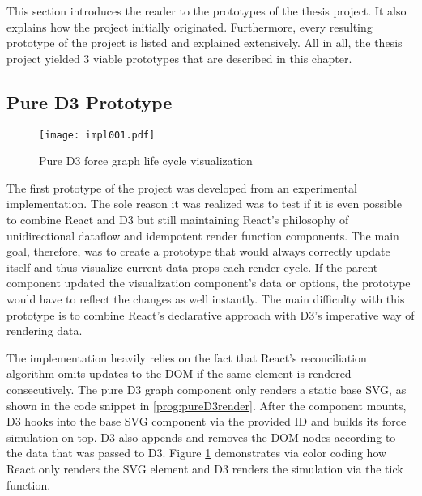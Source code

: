 This section introduces the reader to the prototypes of the thesis project. It also explains how the project initially originated. Furthermore, every resulting prototype of the project is listed and explained extensively. All in all, the thesis project yielded 3 viable prototypes that are described in this chapter. 


\subsection{Pure D3 Prototype}
\label{sec:pureD3prototype}

\begin{figure}
\centering
\texttt{[image: impl001.pdf]}
\caption{Pure D3 force graph life cycle visualization}
\label{fig:pureD3Lifecycle}
\end{figure}

The first prototype of the project was developed from an experimental implementation. The sole reason it was realized was to test if it is even possible to combine React and D3 but still maintaining React's philosophy of unidirectional dataflow and idempotent render function components. The main goal, therefore, was to create a prototype that would always correctly update itself and thus visualize current data props each render cycle. If the parent component updated the visualization component's data or options, the prototype would have to reflect the changes as well instantly. The main difficulty with this prototype is to combine React's declarative approach with D3's imperative way of rendering data.

The implementation heavily relies on the fact that React's reconciliation algorithm omits updates to the DOM if the same element is rendered consecutively. The pure D3 graph component only renders a static base SVG, as shown in the code snippet in \ref{prog:pureD3render}. After the component mounts, D3 hooks into the base SVG component via the provided ID and builds its force simulation on top. D3 also appends and removes the DOM nodes according to the data that was passed to D3. Figure \ref{fig:pureD3Lifecycle} demonstrates via color coding how React only renders the SVG element and D3 renders the simulation via the tick function.

